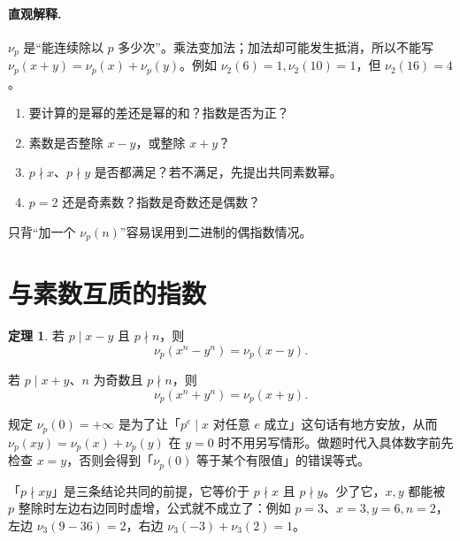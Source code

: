 \documentclass[UTF8,a4paper,11pt,oneside,openany,fontset=fandol]{ctexbook}
\theoremstyle{definition}
\newtheorem{theorem}[definition]{定理}
\begin{document}
\paragraph{直观解释.} $\nu_p$ 是“能连续除以 $p$ 多少次”。乘法变加法；加法却可能发生抵消，所以不能写 $\nu_p(x+y)=\nu_p(x)+\nu_p(y)$。例如 $\nu_2(6)=1,\nu_2(10)=1$，但 $\nu_2(16)=4$。
\begin{teach}
\begin{enumerate}
\item 要计算的是幂的差还是幂的和？指数是否为正？
\item 素数是否整除 $x-y$，或整除 $x+y$？
\item $p\nmid x$、$p\nmid y$ 是否都满足？若不满足，先提出共同素数幂。
\item $p=2$ 还是奇素数？指数是奇数还是偶数？
\end{enumerate}
只背“加一个 $\nu_p(n)$”容易误用到二进制的偶指数情况。
\end{teach}


\section{与素数互质的指数}
\begin{theorem}
若 $p\mid x-y$ 且 $p\nmid n$，则
\[
 \nu_p(x^n-y^n)=\nu_p(x-y).
\]



若 $p\mid x+y$、$n$ 为奇数且 $p\nmid n$，则
\[
 \nu_p(x^n+y^n)=\nu_p(x+y).
\]
\end{theorem}

\begin{tip}
规定 $\nu_p(0)=+\infty$ 是为了让「$p^e\mid x$ 对任意 $e$ 成立」这句话有地方安放，从而 $\nu_p(xy)=\nu_p(x)+\nu_p(y)$ 在 $y=0$ 时不用另写情形。做题时代入具体数字前先检查 $x=y$，否则会得到「$\nu_p(0)$ 等于某个有限值」的错误等式。
\end{tip}


\begin{tip}
「$p\nmid xy$」是三条结论共同的前提，它等价于 $p\nmid x$ 且 $p\nmid y$。少了它，$x,y$ 都能被 $p$ 整除时左边右边同时虚增，公式就不成立了：例如 $p=3$、$x=3,y=6,n=2$，左边 $\nu_3(9-36)=2$，右边 $\nu_3(-3)+\nu_3(2)=1$。
\end{tip}
\end{document}
